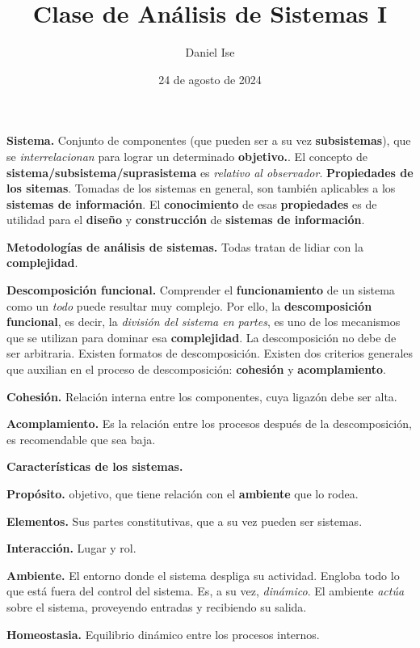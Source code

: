 \documentclass{article}
\title{Clase de Análisis de Sistemas I}
\author{Daniel Ise}
\date{24 de agosto de 2024}
\begin{document}
\maketitle

\textbf{Sistema.} Conjunto de componentes (que pueden ser a su vez
\textbf{subsistemas}), que se \textit{interrelacionan} para lograr un
determinado \textbf{objetivo.}.
El concepto de \textbf{sistema/subsistema/suprasistema} es
\textit{relativo al observador}.
\textbf{Propiedades de los sitemas}. Tomadas de los sistemas en general, son
también aplicables a los \textbf{sistemas de información}. El
\textbf{conocimiento} de esas \textbf{propiedades} es de utilidad para el
\textbf{diseño} y \textbf{construcción} de \textbf{sistemas de información}.

\textbf{Metodologías de análisis de sistemas.} Todas tratan de lidiar con la 
\textbf{complejidad}.

\textbf{Descomposición funcional.} Comprender el \textbf{funcionamiento} de un 
sistema como un \textit{todo} puede resultar muy complejo. Por ello, la
\textbf{descomposición funcional}, es decir, la
\textit{división del sistema en partes}, es uno de los mecanismos que se
utilizan para dominar esa \textbf{complejidad}. La descomposición no debe de ser
arbitraria. Existen formatos de descomposición. Existen dos criterios generales
que auxilian en el proceso de descomposición: \textbf{cohesión} y 
\textbf{acomplamiento}.

\textbf{Cohesión.} Relación interna entre los componentes, cuya ligazón debe ser
alta.

\textbf{Acomplamiento.} Es la relación entre los procesos después de la 
descomposición, es recomendable que sea baja. 

\textbf{Características de los sistemas.} 

\textbf{Propósito.} objetivo, que tiene relación con el \textbf{ambiente} que lo
rodea. 

\textbf{Elementos.} Sus partes constitutivas, que a su vez pueden ser sistemas.

\textbf{Interacción.} Lugar y rol.

\textbf{Ambiente.} El entorno donde el sistema despliga su actividad. Engloba
todo lo que está fuera del control del sistema. Es, a su vez, \textit{dinámico}.
El ambiente \textit{actúa} sobre el sistema, proveyendo entradas y recibiendo su
salida.

\textbf{Homeostasia.} Equilibrio dinámico entre los procesos internos.
\end{document}
